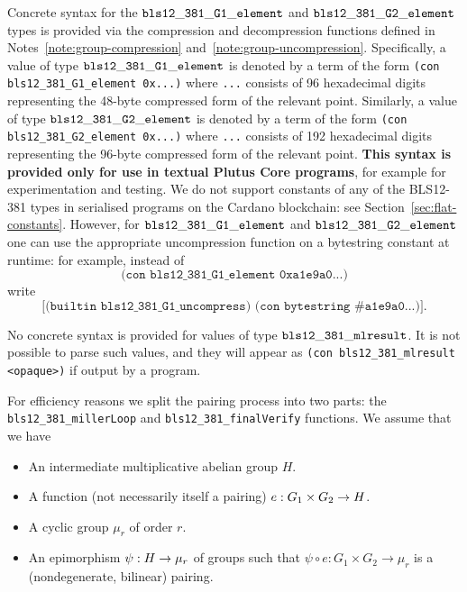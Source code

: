 \label{note:bls-syntax}
Concrete syntax for the $\mathtt{bls12\_381\_G1\_element}$ and
$\mathtt{bls12\_381\_G2\_element}$ types is provided via the compression and
decompression functions defined in Notes~\ref{note:group-compression}
and~\ref{note:group-uncompression}.  Specifically, a value of type
$\mathtt{bls12\_381\_G1\_element}$ is denoted by a term of the form \texttt{(con
bls12\_381\_G1\_element 0x...)} where \texttt{...}  consists of 96 hexadecimal
digits representing the 48-byte compressed form of the relevant point.
Similarly, a value of type $\mathtt{bls12\_381\_G2\_element}$ is denoted by a term
of the form \texttt{(con bls12\_381\_G2\_element 0x...)}  where \texttt{...}
consists of 192 hexadecimal digits representing the 96-byte compressed form of
the relevant point.  \textbf{This syntax is provided only for use in textual
Plutus Core programs}, for example for experimentation and testing.  We do not
support constants of any of the BLS12-381 types in serialised programs on the
Cardano blockchain: see Section~\ref{sec:flat-constants}.  However, for
$\mathtt{bls12\_381\_G1\_element}$ and $\mathtt{bls12\_381\_G2\_element}$ one can use
the appropriate uncompression function on a  bytestring constant at runtime:
for example, instead of
$$
\texttt{(con bls12\_381\_G1\_element 0xa1e9a0...)}
$$
write
$$
\texttt{[(builtin bls12\_381\_G1\_uncompress) (con bytestring \#a1e9a0...)]}.
$$

\noindent
No concrete syntax is provided for values of type
$\mathtt{bls12\_381\_mlresult}$. It is not possible to parse such values, and they
will appear as \texttt{(con bls12\_381\_mlresult <opaque>)} if output by a
program.


\label{note:pairing}
For efficiency reasons we split the pairing process into two parts:
the \texttt{bls12\_381\_millerLoop} and \texttt{bls12\_381\_finalVerify}
functions.  We assume that we have
\begin{itemize}
\item An intermediate multiplicative abelian group $H$.
\item A function (not necessarily itself a pairing) $e: G_1 \times
G_2 \rightarrow H$.
\item A cyclic group $\mu_r$ of order $r$.
\item An epimorphism $\psi: H \rightarrow \mu_r$ of groups such
that $\psi \circ e: G_1 \times G_2 \rightarrow \mu_r$ is a (nondegenerate,
bilinear) pairing.
\end{itemize}

